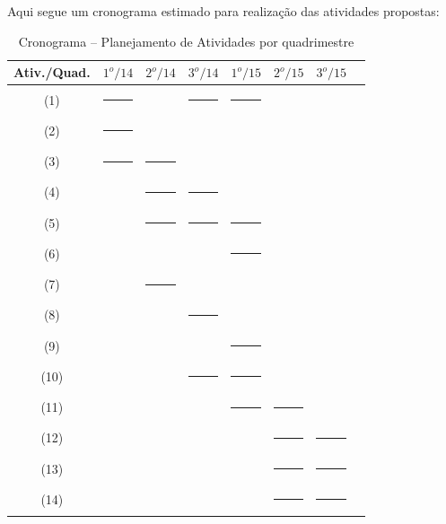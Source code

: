 \documentclass[a4paper,11pt,brazil,fleqn]{article}
\begin{document}
Aqui segue um cronograma estimado para realiza\c{c}\~ao das atividades propostas:

\begin{table}[!ht]
\begin{center}
\caption[Cronograma]{Cronograma -- Planejamento de Atividades por quadrimestre}
\begin{tabular}{|c|c|c|c|c|c|c|c|} 
	\hline
	\rule[-2mm]{0mm}{6mm}
	Ativ./Quad. & $1^o/14$ & $2^o/14$ & $3^o/14$ & $1^o/15$ & $2^o/15$ & $3^o/15$ \\
	\hline
	\rule[-2mm]{0mm}{6mm}
	(1) & \rule[0mm]{10mm}{2mm} & & \rule[0mm]{10mm}{2mm} & \rule[0mm]{10mm}{2mm} &  &   \\
	\rule[-1mm]{0mm}{5mm}
	(2) & \rule[0mm]{10mm}{2mm} &  &  &  &  &   \\
	\rule[-1mm]{0mm}{5mm}
	(3) & \rule[0mm]{10mm}{2mm} & \rule[0mm]{10mm}{2mm} &  &  &  
	&  \\
	\rule[-1mm]{0mm}{5mm}
	(4) &  & \rule[0mm]{10mm}{2mm}  & \rule[0mm]{10mm}{2mm}  &  &  & \\
	\rule[-1mm]{0mm}{5mm}
	(5) &   & \rule[0mm]{10mm}{2mm} & \rule[0mm]{10mm}{2mm} & \rule[0mm]{10mm}{2mm} &  & \\
	\rule[-1mm]{0mm}{5mm}
	(6) &   &  &  & \rule[0mm]{10mm}{2mm} &  &  \\
	\rule[-1mm]{0mm}{5mm}
	(7) &  & \rule[0mm]{10mm}{2mm} &  &  &  & \\ 
	\rule[-1mm]{0mm}{5mm}
	(8) &  &  & \rule[0mm]{10mm}{2mm} &  &  & \\
	\rule[-1mm]{0mm}{5mm}
	(9) &  &  &  & \rule[0mm]{10mm}{2mm} &  & \\
	\rule[-1mm]{0mm}{5mm}
	(10) &  &  & \rule[0mm]{10mm}{2mm} & \rule[0mm]{10mm}{2mm} &  & \  \\
	\rule[-2mm]{0mm}{6mm}
	(11) &  &  &  & \rule[0mm]{10mm}{2mm} & \rule[0mm]{10mm}{2mm} &   \\
	\rule[-2mm]{0mm}{6mm}
	(12) &  &  &  &  & \rule[0mm]{10mm}{2mm} & \rule[0mm]{10mm}{2mm}  \\
	\rule[-2mm]{0mm}{6mm}
	(13) &  &  &  &  & \rule[0mm]{10mm}{2mm} & \rule[0mm]{10mm}{2mm}  \\
	\rule[-2mm]{0mm}{6mm}
	(14) &  &  &  &  & \rule[0mm]{10mm}{2mm} & \rule[0mm]{10mm}{2mm}  \\
	\hline
\end{tabular} 
\label{crono}
\end{center}
\end{table}





{} 



\end{document}

